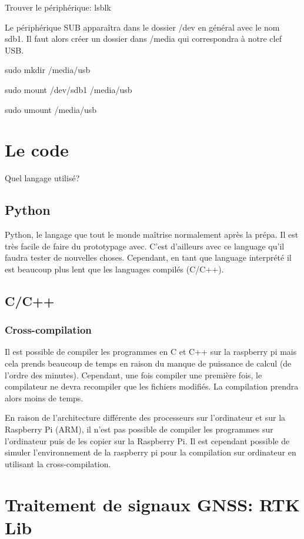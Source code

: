 \documentclass[a4paper, 11pt]{report}
\begin{document}
Trouver le périphérique:
lsblk

Le périphérique SUB apparaîtra dans le dossier /dev en général avec le nom sdb1. Il faut alors créer un dossier dans /media qui correspondra à notre clef USB.

sudo  mkdir /media/usb 

sudo mount /dev/sdb1 /media/usb

sudo umount /media/usb

\chapter{Le code}

Quel langage utilisé?

\section{Python}
Python, le langage que tout le monde maîtrise normalement après la prépa. Il est très facile de faire du prototypage avec. C'est d'ailleurs avec ce language qu'il faudra tester de nouvelles choses. Cependant, en tant que language interprété il est beaucoup plus lent que les languages compilés (C/C++).

\section{C/C++}

\subsection{Cross-compilation}
Il est possible de compiler les programmes en C et C++ sur la raspberry pi mais cela prends beaucoup de temps en raison du manque de puissance de calcul (de l'ordre des minutes). Cependant, une fois compiler une première fois, le compilateur ne devra recompiler que les fichiers modifiés. La compilation prendra alors moins de temps. 

En raison de l'architecture différente des processeurs sur l'ordinateur et sur la Raspberry Pi (ARM), il n'est pas possible de compiler les programmes sur l'ordinateur puis de les copier sur la Raspberry Pi. Il est cependant possible de simuler l'environnement de la raspberry pi pour la compilation sur ordinateur en utilisant la cross-compilation.

\chapter{Traitement de signaux GNSS: RTK Lib}
\end{document}
